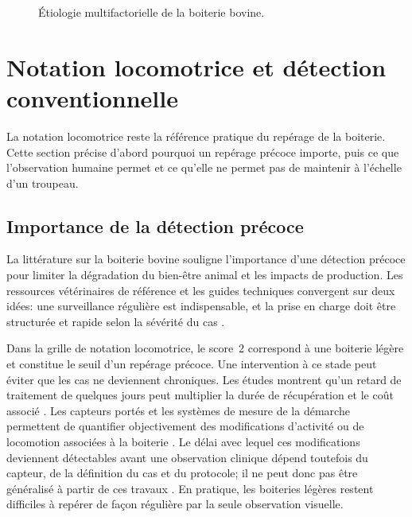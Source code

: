 \begin{figure}[H]
{%
    }
    \caption{Étiologie multifactorielle de la boiterie bovine.}
    \label{fig:etiologie}
\end{figure}

\section{Notation locomotrice et détection conventionnelle}

La notation locomotrice reste la référence pratique du repérage de la boiterie. Cette
section précise d'abord pourquoi un repérage précoce importe, puis ce que l'observation
humaine permet et ce qu'elle ne permet pas de maintenir à l'échelle d'un troupeau.

\subsection{Importance de la détection précoce}
La littérature sur la boiterie bovine souligne l'importance d'une détection précoce
\citep{oleary2020accelerometers,qiao2021review} pour
limiter la dégradation du bien-être animal et les impacts de production. Les ressources
vétérinaires de référence et les guides techniques convergent sur deux idées:
une surveillance régulière est indispensable, et la prise en charge doit être
structurée et rapide selon la sévérité du cas
\citep{merck_lameness_overview,dairynz_treating_lameness}.

Dans la grille de notation locomotrice, le score~2 correspond à une boiterie légère et constitue
le seuil d'un repérage précoce. Une intervention à ce stade peut éviter que les cas ne deviennent
chroniques. Les études montrent qu'un
retard de traitement de quelques jours peut multiplier la durée de récupération et le
coût associé \citep{green2002financial}. Les capteurs portés et les systèmes de mesure de
la démarche permettent de quantifier objectivement des modifications d'activité ou de
locomotion associées à la boiterie
\citep{chapinal2010measurement,pastell2009measurement}. Le délai avec lequel ces
modifications deviennent détectables avant une observation clinique dépend toutefois du
capteur, de la définition du cas et du protocole; il ne peut donc pas être généralisé à
partir de ces travaux \citep{oleary2020accelerometers,alsaaod2019automatic}. En pratique, les boiteries légères restent difficiles à repérer de
façon régulière par la seule observation visuelle.

